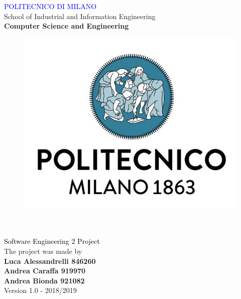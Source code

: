 
\usepackage[dvipsnames]{xcolor}
\usepackage{listings}
\usepackage{placeins}
\usepackage{graphicx,color,listings}
\usepackage{float}
\usepackage[export]{adjustbox}
\usepackage{hyperref}%
\hypersetup{%
  colorlinks = true,
  linkcolor  = black
}
\usepackage{sectsty}


\sectionfont{\huge}
\subsectionfont{\LARGE}
\subsubsectionfont{\Large}








\begin{titlepage}

\centering
{\textcolor{Blue}{\LARGE  {POLITECNICO DI MILANO}}}\\[0.5CM]
\Large {School of Industrial and Information Engineering}\\[0.3CM]
\textbf{\Large Computer Science and Engineering}\\
[1cm]
\begin{figure}[H]
\centering
\includegraphics[scale = 0.3]{Images/Logo/logo.jpg}\\
[1cm]
\end{figure}
{\fontsize{35}{35} }\\[0.5cm]
{\fontsize{25}{70} }\\[0.5cm]     
{\textcolor{Black}{\LARGE{Software Engineering 2 Project}}}\\ [2cm]     
\centering
The project was made by\\[0.5cm]
\textbf {\LARGE Luca Alessandrelli 846260}\\[0.2cm]
\textbf {\LARGE Andrea Caraffa 919970}\\[0.2cm]
\textbf {\LARGE Andrea Bionda 921082}\\[0.5cm]
Version 1.0  -  2018/2019
\end{titlepage}

